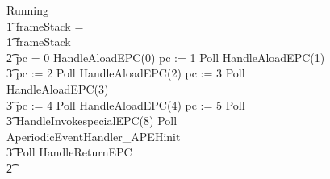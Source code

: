 \begin{figure}[t]
  \setlength{\zedindent}{0cm}
  \setlength{\zedtab}{0.3cm}
  \setlength{\zedleftsep}{0cm}
  \begin{circus}
    Running \circdef \\
    \t1 \circif frameStack = \emptyset \circthen \Skip \\
    \t1 {} \circelse frameStack \neq \emptyset \circthen {} \\
    \t2 {} \circif pc = 0 \circthen HandleAloadEPC(0) \circseq pc := 1 \circseq Poll \circseq HandleAloadEPC(1) \circseq \\
    \t3 pc := 2 \circseq Poll \circseq HandleAloadEPC(2) \circseq pc := 3 \circseq Poll \circseq HandleAloadEPC(3) \circseq \\
    \t3 pc := 4 \circseq Poll \circseq HandleAloadEPC(4) \circseq pc := 5 \circseq Poll \circseq \\
    \t3 HandleInvokespecialEPC(8) \circseq Poll \circseq AperiodicEventHandler\_APEHinit \circseq \\
    \t3 Poll \circseq HandleReturnEPC \\
    \t2 {} \cdots {} \\

\end{circus}
\end{figure}
